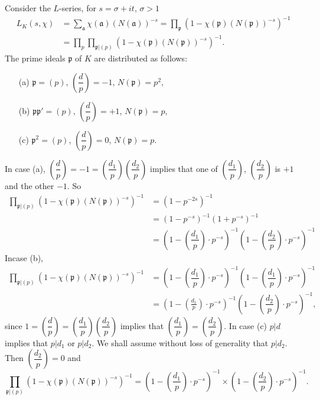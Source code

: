 Consider the $L$-series, for $s=\sigma+it$, $\sigma>1$
\begin{align*}
L_{K}(s,\chi) &=
\sum_{\mathfrak{a}}\chi(\mathfrak{a})(N(\mathfrak{a}))^{-s}=\prod_{\mathfrak{p}}(1-\chi(\mathfrak{p})(N(\mathfrak{p}))^{-s})^{-1}\\
&=
\prod_{p}\prod_{\mathfrak{p}|(p)}(1-\chi(\mathfrak{p})(N(\mathfrak{p}))^{-s})^{-1}. 
\end{align*}
The prime ideals $\mathfrak{p}$ of $K$ are distributed as follows:
\begin{itemize}
\item[(a)] $\mathfrak{p}=(p)$, $\left(\dfrac{d}{p}\right)=-1$,
  $N(\mathfrak{p})=p^{2}$, 

\item[(b)] $\mathfrak{p}\mathfrak{p}'=(p)$,
  $\left(\dfrac{d}{p}\right)=+1$, $N(\mathfrak{p})=p$,

\item[(c)] $\mathfrak{p}^{2}=(p)$, $\left(\dfrac{d}{p}\right)=0$,
  $N(\mathfrak{p})=p$. 
\end{itemize}
In case (a),
$\left(\dfrac{d}{p}\right)=-1=\left(\dfrac{d_{1}}{p}\right)\left(\dfrac{d_{2}}{p}\right)$
implies that one of $\left(\dfrac{d_{1}}{p}\right)$,
$\left(\dfrac{d_{2}}{p}\right)$ is $+1$ and the other $-1$. So
\begin{align*}
\prod_{\mathfrak{p}|(p)}(1-\chi(\mathfrak{p})(N(\mathfrak{p}))^{-s})^{-1}
&= (1-p^{-2s})^{-1}\\
&= (1-p^{-s})^{-1}(1+p^{-s})^{-1}\\
&= \left(1-\left(\dfrac{d_{1}}{p}\right)\cdot
p^{-s}\right)^{-1}\left(1-\left(\dfrac{d_{2}}{p}\right)\cdot
p^{-s}\right)^{-1} 
\end{align*}
In\pageoriginale case (b),
\begin{align*}
\prod_{\mathfrak{p}|(p)}(1-\chi(\mathfrak{p})(N(\mathfrak{p}))^{-s})^{-1}
&= \left(1-\left(\dfrac{d_{1}}{p}\right)\cdot
p^{-s}\right)^{-1}\left(1-\left(\dfrac{d_{1}}{p}\right)\cdot
p^{-s}\right)^{-1}\\
&= \left(1-\left(\frac{d_{1}}{p}\right)\cdot
p^{-s}\right)^{-1}\left(1-\left(\dfrac{d_{2}}{p}\right)\cdot
p^{-s}\right)^{-1}, 
\end{align*}
since
$1=\left(\dfrac{d}{p}\right)=\left(\dfrac{d_{1}}{p}\right)\left(\dfrac{d_{2}}{p}\right)$
implies that
$\left(\dfrac{d_{1}}{p}\right)=\left(\dfrac{d_{2}}{p}\right)$. In case
(c) $p|d$ implies that $p|d_{1}$ or $p|d_{2}$. We shall assume without
loss of generality that $p|d_{2}$. Then
$\left(\dfrac{d_{2}}{p}\right)=0$ and 
$$
\prod_{\mathfrak{p}|(p)}(1-\chi(\mathfrak{p})(N(\mathfrak{p}))^{-s})^{-1}=\left(1-\left(\dfrac{d_{1}}{p}\right)\cdot
p^{-s}\right)^{-1}\times \left(1-\left(\dfrac{d_{2}}{p}\right)\cdot
p^{-s}\right)^{-1}. 
$$

